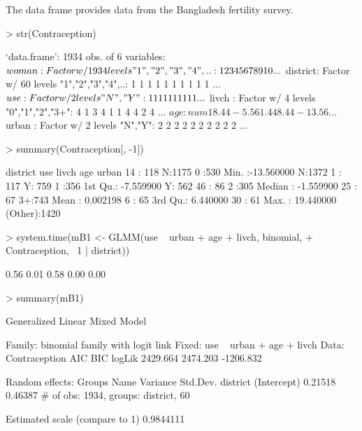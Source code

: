 \documentclass[12pt]{article}
\begin{document}
The data frame  provides data from the
Bangladesh fertility survey.
\begin{Schunk}
\begin{Sinput}
> str(Contraception)
\end{Sinput}
\begin{Soutput}
`data.frame':	1934 obs. of  6 variables:
 $ woman   : Factor w/ 1934 levels "1","2","3","4",..: 1 2 3 4 5 6 7 8 9 10 ...
 $ district: Factor w/ 60 levels "1","2","3","4",..: 1 1 1 1 1 1 1 1 1 1 ...
 $ use     : Factor w/ 2 levels "N","Y": 1 1 1 1 1 1 1 1 1 1 ...
 $ livch   : Factor w/ 4 levels "0","1","2","3+": 4 1 3 4 1 1 4 4 2 4 ...
 $ age     : num   18.44  -5.56   1.44   8.44 -13.56 ...
 $ urban   : Factor w/ 2 levels "N","Y": 2 2 2 2 2 2 2 2 2 2 ...
\end{Soutput}
\begin{Sinput}
> summary(Contraception[, -1])
\end{Sinput}
\begin{Soutput}
    district    use      livch         age             urban   
 14     : 118   N:1175   0 :530   Min.   :-13.560000   N:1372  
 1      : 117   Y: 759   1 :356   1st Qu.: -7.559900   Y: 562  
 46     :  86            2 :305   Median : -1.559900           
 25     :  67            3+:743   Mean   :  0.002198           
 6      :  65                     3rd Qu.:  6.440000           
 30     :  61                     Max.   : 19.440000           
 (Other):1420                                                  
\end{Soutput}
\begin{Sinput}
> system.time(mB1 <- GLMM(use ~ urban + age + livch, binomial, 
+     Contraception, ~1 | district))
\end{Sinput}
\begin{Soutput}
[1] 0.56 0.01 0.58 0.00 0.00
\end{Soutput}
\begin{Sinput}
> summary(mB1)
\end{Sinput}
\begin{Soutput}
Generalized Linear Mixed Model

Family: binomial family with logit link
Fixed: use ~ urban + age + livch 
Data: Contraception 
      AIC      BIC    logLik
 2429.664 2474.203 -1206.832

Random effects:
     Groups        Name    Variance    Std.Dev. 
   district (Intercept)     0.21518     0.46387 
# of obs: 1934, groups: district, 60

Estimated scale (compare to 1)  0.9844111 


\end{Soutput}
\end{Schunk}
\end{document}
